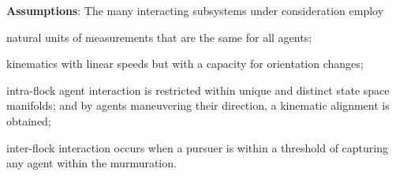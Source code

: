  \noindent \textbf{Assumptions}:
The many interacting subsystems under consideration employ
 \begin{inparaenum}[(i)]
 	\item natural units of measurements that are the same for all agents; 
 	\item kinematics with linear speeds but with a capacity for orientation changes;
 	\item intra-flock agent interaction is restricted within unique and distinct state space manifolds; and by agents maneuvering their direction, a kinematic alignment is obtained;
 	\item inter-flock interaction occurs when a pursuer is within a threshold of capturing any agent within the murmuration.
 \end{inparaenum} 

